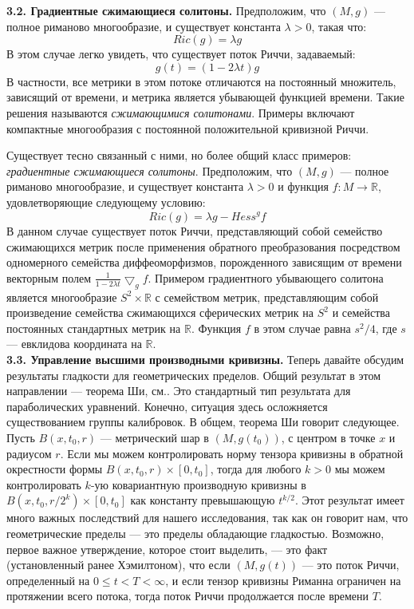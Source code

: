 \textbf{3.2. Градиентные сжимающиеся солитоны.} Предположим, что 
$(M,g)$ — полное риманово многообразие, и существует константа 
$\lambda >0$, такая что:
\[
    Ric(g)=\lambda g
\]
В этом случае легко увидеть, что существует поток Риччи, задаваемый:
\[
    g(t)=(1-2\lambda t)g
\]
В частности, все метрики в этом потоке отличаются на постоянный множитель, 
зависящий от времени, и метрика является убывающей функцией времени. 
Такие решения называются \textit{сжимающимися солитонами}. Примеры включают 
компактные многообразия с постоянной положительной кривизной Риччи.

Существует тесно связанный с ними, но более общий класс примеров: 
\textit{градиентные сжимающиеся солитоны}. Предположим, что 
$(M,g)$ — полное риманово многообразие, и существует константа 
$\lambda >0$ и функция $f:M \rightarrow \mathbb{R}$, удовлетворяющие следующему условию:
\[
    Ric(g)=\lambda g - {Hess}^g f
\]
В данном случае существует поток Риччи, представляющий собой 
семейство сжимающихся метрик после применения обратного 
преобразования посредством одномерного семейства диффеоморфизмов, 
порожденного зависящим от времени векторным полем 
$\frac{1}{1-2\lambda t}{\bigtriangledown}_g f$. 
Примером градиентного убывающего солитона является многообразие 
$S^2 \times \mathbb{R}$ с семейством метрик, представляющим 
собой произведение семейства сжимающихся сферических метрик на 
$S^2$ и семейства постоянных стандартных метрик на $\mathbb{R}$. 
Функция $f$ в этом случае равна $s^2/4$, 
где $s$ — евклидова координата на $\mathbb{R}$.\\

\textbf{3.3. Управление высшими производными кривизны.} Теперь 
давайте обсудим результаты гладкости для геометрических пределов. 
Общий результат в этом направлении — теорема Ши, см.\cite{c65, c66}. 
Это стандартный тип результата для параболических уравнений. 
Конечно, ситуация здесь осложняется существованием группы калибровок. 
В общем, теорема Ши говорит следующее. Пусть  
$B(x,t_0,r)$ — метрический шар в $(M,g(t_0))$, с центром в точке  
$x$ и радиусом $r$. Если мы можем контролировать норму тензора 
кривизны в обратной окрестности формы $B(x,t_0,r)\times [0,t_0]$, 
тогда для любого $k>0$ мы можем контролировать $k$-ую 
ковариантную производную кривизны в 
$B(x,t_0,r/2^k)\times [0,t_0]$ как константу превышающую 
$t^{k/2}$. Этот результат имеет много важных последствий для 
нашего исследования, так как он говорит нам, что геометрические 
пределы — это пределы обладающие гладкостью. 
Возможно, первое важное утверждение, которое 
стоит выделить, — это факт (установленный ранее Хэмилтоном), 
что если $(M,g(t))$ — это поток Риччи, 
определенный на $0 \leq t< T< \infty$, и если тензор кривизны Риманна 
ограничен на протяжении всего потока, тогда поток Риччи 
продолжается после времени $T$. 

